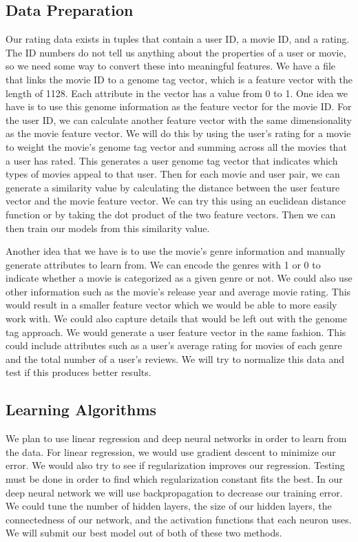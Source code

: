 \documentclass[11pt]{article}
\begin{document}
\subsection{Data Preparation}

Our rating data exists in tuples that contain a user ID, a movie ID, and a rating. The ID numbers do not tell us
anything about the properties of a user or movie, so we need some way to convert these into meaningful features.
We have a file that links the movie ID to a genome tag vector, which is a feature vector with the length of 1128. Each
attribute in the vector has a value from 0 to 1. One idea we have is to use this genome information as the feature
vector for the movie ID. For the user ID, we can calculate another feature vector with the same dimensionality as the
movie feature vector. We will do this by using the user's rating for a movie to weight the movie's genome tag vector
and summing across all the movies that a user has rated. This generates a user genome tag vector that indicates which types
of movies appeal to that user. Then for each movie and user pair, we can generate a similarity value by
calculating the distance between the user feature vector and the movie feature vector. We can try this using an euclidean
distance function or by taking the dot product of the two feature vectors. Then we can then train our models from this
similarity value.

Another idea that we have is to use the movie's genre information and manually generate attributes to learn from. We
can encode the genres with 1 or 0 to indicate whether a movie is categorized as a given genre or not. We could also
use other information such as the movie's release year and average movie rating. This would result in a smaller
feature vector which we would be able to more easily work with. We could also capture details that would be left
out with the genome tag approach. We would generate a user feature vector in the same fashion. This could include
attributes such as a user's average rating for movies of each genre and the total number of a user's reviews.
We will try to normalize this data and test if this produces better results.

\subsection{Learning Algorithms}

We plan to use linear regression and deep neural networks in order to learn from the data. For linear regression,
we would use gradient descent to minimize our error. We would also try to see if regularization improves
our regression. Testing must be done in order to find which regularization constant fits the best. In our deep neural
network we will use backpropagation to decrease our training error. We could tune the number of hidden layers, the
size of our hidden layers, the connectedness of our network, and the activation functions that each neuron uses.
We will submit our best model out of both of these two methods.
\end{document}
